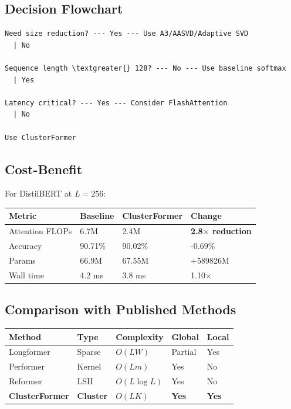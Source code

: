 \subsection{Decision Flowchart}

\begin{lstlisting}
Need size reduction? --- Yes --- Use A3/AASVD/Adaptive SVD
  | No
   
Sequence length \textgreater{} 128? --- No --- Use baseline softmax
  | Yes
   
Latency critical? --- Yes --- Consider FlashAttention
  | No
   
Use ClusterFormer
\end{lstlisting}

\subsection{Cost-Benefit}

For DistilBERT at $L=256$:

\begin{table}[H]
\centering
\small
\begin{tabular}{llll}
\toprule
\textbf{Metric} & \textbf{Baseline} & \textbf{ClusterFormer} & \textbf{Change} \\
\midrule
Attention FLOPs & 6.7M & 2.4M & \textbf{2.8$\times$ reduction} \\
Accuracy & 90.71\% & 90.02\% & -0.69\% \\
Params & 66.9M & 67.55M & +589826M \\
Wall time & 4.2 ms & 3.8 ms & 1.10$\times$ \\
\bottomrule
\end{tabular}
\end{table}

\subsection{Comparison with Published Methods}

\begin{table}[H]
\centering
\small
\begin{tabular}{lllll}
\toprule
\textbf{Method} & \textbf{Type} & \textbf{Complexity} & \textbf{Global} & \textbf{Local} \\
\midrule
Longformer & Sparse & $O(LW)$ & Partial & Yes \\
Performer & Kernel & $O(Lm)$ & Yes & No \\
Reformer & LSH & $O(L\log L)$ & Yes & No \\
\textbf{ClusterFormer} & \textbf{Cluster} & \textbf{$O(LK)$} & \textbf{Yes} & \textbf{Yes} \\
\bottomrule
\end{tabular}
\end{table}

